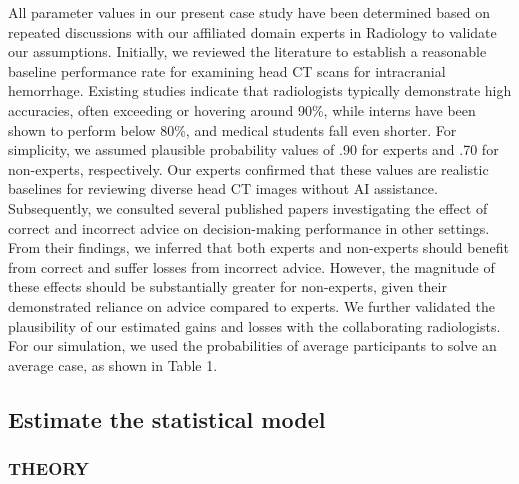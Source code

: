 \documentclass[
  man,floatsintext]{apa6}
\begin{document}
All parameter values in our present case study have been determined based on repeated discussions with our affiliated domain experts in Radiology to validate our assumptions.
Initially, we reviewed the literature to establish a reasonable baseline performance rate for examining head CT scans for intracranial hemorrhage.
Existing studies indicate that radiologists typically demonstrate high accuracies, often exceeding or hovering around 90\%, while interns have been shown to perform below 80\%, and medical students fall even shorter.
For simplicity, we assumed plausible probability values of .90 for experts and .70 for non-experts, respectively.
Our experts confirmed that these values are realistic baselines for reviewing diverse head CT images without AI assistance. Subsequently, we consulted several published papers investigating the effect of correct and incorrect advice on decision-making performance in other settings.
From their findings, we inferred that both experts and non-experts should benefit from correct and suffer losses from incorrect advice.
However, the magnitude of these effects should be substantially greater for non-experts, given their demonstrated reliance on advice compared to experts.
We further validated the plausibility of our estimated gains and losses with the collaborating radiologists.
For our simulation, we used the probabilities of average participants to solve an average case, as shown in Table 1.

\hypertarget{estimate-the-statistical-model}{%
\subsection{Estimate the statistical model}\label{estimate-the-statistical-model}}

\hypertarget{theory-6}{%
\subsubsection{THEORY}\label{theory-6}}
\end{document}
